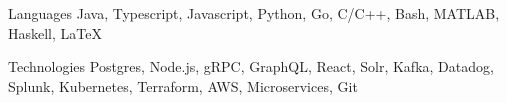 

\begin{cvskills}

  \cvskill
    {Languages} %
    {Java, Typescript, Javascript, Python, Go, C/C++, Bash, MATLAB, Haskell, LaTeX} %

  \cvskill
    {Technologies} %
    {Postgres, Node.js, gRPC, GraphQL, React, Solr, Kafka, Datadog, Splunk, Kubernetes, Terraform, AWS, Microservices, Git} %

\end{cvskills}

